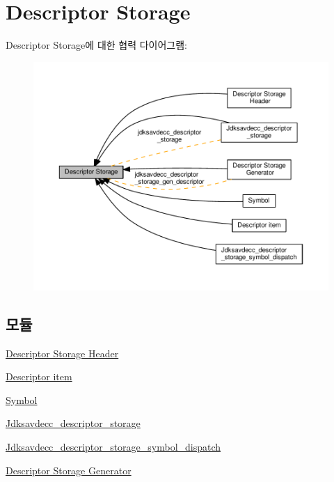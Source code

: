 \hypertarget{group__descriptor__storage}{}\section{Descriptor Storage}
\label{group__descriptor__storage}
Descriptor Storage에 대한 협력 다이어그램\+:
\nopagebreak
\begin{figure}[H]
\begin{center}
\leavevmode
\includegraphics[width=350pt]{group__descriptor__storage}
\end{center}
\end{figure}
\subsection*{모듈}
\begin{DoxyCompactItemize}
\item 
\hyperlink{group__descriptor__storage__header}{Descriptor Storage Header}
\item 
\hyperlink{group__descriptor__storage__item}{Descriptor item}
\item 
\hyperlink{group__descriptor__storage__symbol}{Symbol}
\item 
\hyperlink{group__jdksavdecc__descriptor__storage}{Jdksavdecc\+\_\+descriptor\+\_\+storage}
\item 
\hyperlink{group__jdksavdecc__descriptor__storage__symbol__dispatch}{Jdksavdecc\+\_\+descriptor\+\_\+storage\+\_\+symbol\+\_\+dispatch}
\item 
\hyperlink{group__descriptor__storage__gen}{Descriptor Storage Generator}
\end{DoxyCompactItemize}
